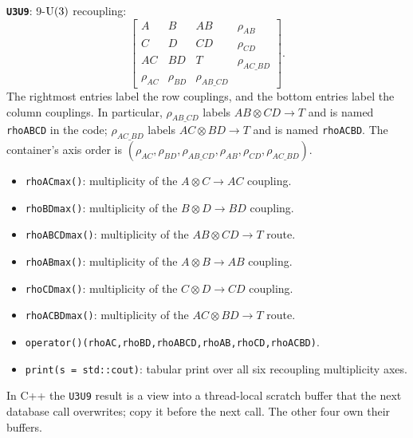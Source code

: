 \documentclass[aps,onecolumn,10pt,superscriptaddress,floatfix,nofootinbib]{revtex4}
\begin{document}
\textbf{\texttt{U3U9}}: 9-$\rm U(3)$ recoupling:
\begin{equation}
 \left[\begin{array}{cccc}
 A & B & AB & \rho_{AB} \\
 C & D & CD & \rho_{CD} \\
 AC & BD & T & \rho_{AC\_BD} \\
 \rho_{AC} & \rho_{BD} & \rho_{AB\_CD} &
 \end{array}\right].
\end{equation}
The rightmost entries label the row couplings, and the bottom entries label
the column couplings. In particular, $\rho_{AB\_CD}$ labels
$AB\otimes CD\to T$ and is named \verb|rhoABCD| in the code;
$\rho_{AC\_BD}$ labels $AC\otimes BD\to T$ and is named
\verb|rhoACBD|. The container's axis order is 
$
 (\rho_{AC},\rho_{BD},\rho_{AB\_CD},
   \rho_{AB},\rho_{CD},\rho_{AC\_BD})
$.
\begin{itemize}
    \item \verb|rhoACmax()|: multiplicity of the $A\otimes C\to AC$ coupling.
    \item \verb|rhoBDmax()|: multiplicity of the $B\otimes D\to BD$ coupling.
    \item \verb|rhoABCDmax()|: multiplicity of the $AB \otimes CD \to T$ route.
    \item \verb|rhoABmax()|: multiplicity of the $A\otimes B\to AB$ coupling.
    \item \verb|rhoCDmax()|: multiplicity of the $C\otimes D\to CD$ coupling.
    \item \verb|rhoACBDmax()|: multiplicity of the $AC \otimes BD \to T$ route.
    \item \verb|operator()(rhoAC,rhoBD,rhoABCD,rhoAB,rhoCD,rhoACBD)|.
    \item \verb|print(s = std::cout)|: tabular print over all six recoupling multiplicity axes.
\end{itemize}

In C++ the \verb|U3U9| result is a view into a thread-local scratch buffer that
the next database call overwrites; copy it before the next call. The other four
own their buffers.
\end{document}
